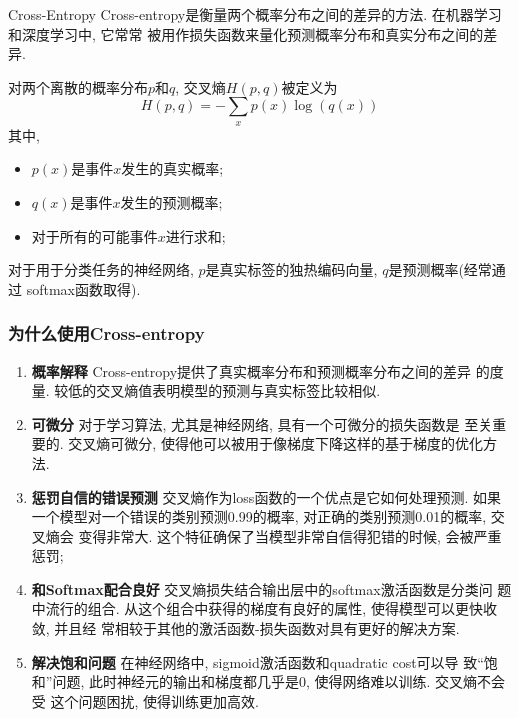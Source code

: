\documentclass{beamer}
\begin{document}
\begin{frame}[fragile]{Cross-Entropy}
	Cross-entropy是衡量两个概率分布之间的差异的方法. 在机器学习和深度学习中, 它常常
	被用作损失函数来量化预测概率分布和真实分布之间的差异.

	对两个离散的概率分布$p$和$q$, 交叉熵$H(p,q)$被定义为
	\begin{equation}
		H(p,q)=-\sum_x{p(x)\log{(q(x))}}
	\end{equation}
	其中,
	\begin{itemize}
		\item $p(x)$是事件$x$发生的真实概率;
		\item $q(x)$是事件$x$发生的预测概率;
		\item 对于所有的可能事件$x$进行求和;
	\end{itemize}

	对于用于分类任务的神经网络, $p$是真实标签的独热编码向量, $q$是预测概率(经常通过
	softmax函数取得).
\end{frame}

\begin{frame}
	\frametitle{为什么使用Cross-entropy}

	\begin{enumerate}
		\item \textbf{概率解释 } Cross-entropy提供了真实概率分布和预测概率分布之间的差异
		      的度量. 较低的交叉熵值表明模型的预测与真实标签比较相似.
		\item \textbf{可微分 } 对于学习算法, 尤其是神经网络, 具有一个可微分的损失函数是
		      至关重要的. 交叉熵可微分, 使得他可以被用于像梯度下降这样的基于梯度的优化方法.
		\item \textbf{惩罚自信的错误预测 } 交叉熵作为loss函数的一个优点是它如何处理预测.
		      如果一个模型对一个错误的类别预测0.99的概率, 对正确的类别预测0.01的概率, 交叉熵会
		      变得非常大. 这个特征确保了当模型非常自信得犯错的时候, 会被严重惩罚;
		\item \textbf{和Softmax配合良好} 交叉熵损失结合输出层中的softmax激活函数是分类问
		      题中流行的组合. 从这个组合中获得的梯度有良好的属性, 使得模型可以更快收敛, 并且经
		      常相较于其他的激活函数-损失函数对具有更好的解决方案.
		\item \textbf{解决饱和问题 } 在神经网络中, sigmoid激活函数和quadratic cost可以导
		      致``饱和''问题, 此时神经元的输出和梯度都几乎是0, 使得网络难以训练. 交叉熵不会受
		      这个问题困扰, 使得训练更加高效.
	\end{enumerate}

\end{frame}
\end{document}
